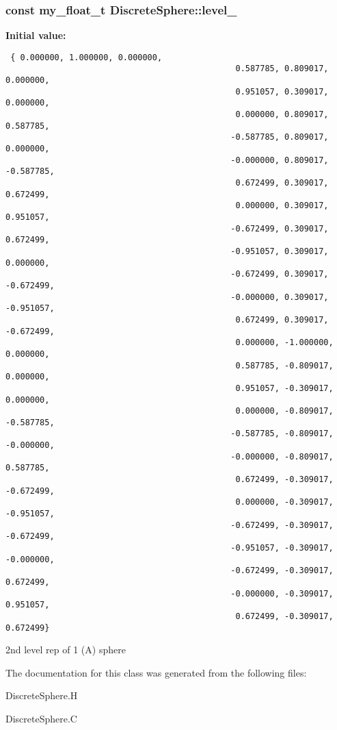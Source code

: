 \subsubsection{\setlength{\rightskip}{0pt plus 5cm}const my\_\-float\_\-t \bf{Discrete\-Sphere::level\_}\hspace{0.3cm}{\tt  [static, private]}}\label{classSimSite3D_1_1DiscreteSphere_e3e514caf92b337aae7cb629d90f9a61}


\textbf{Initial value:}

\begin{Code}\begin{verbatim} { 0.000000, 1.000000, 0.000000,
                                               0.587785, 0.809017, 0.000000,
                                               0.951057, 0.309017, 0.000000,
                                               0.000000, 0.809017, 0.587785,
                                              -0.587785, 0.809017, 0.000000,
                                              -0.000000, 0.809017, -0.587785,
                                               0.672499, 0.309017, 0.672499,
                                               0.000000, 0.309017, 0.951057,
                                              -0.672499, 0.309017, 0.672499,
                                              -0.951057, 0.309017, 0.000000,
                                              -0.672499, 0.309017, -0.672499,
                                              -0.000000, 0.309017, -0.951057,
                                               0.672499, 0.309017, -0.672499,
                                               0.000000, -1.000000, 0.000000,
                                               0.587785, -0.809017, 0.000000,
                                               0.951057, -0.309017, 0.000000,
                                               0.000000, -0.809017, -0.587785,
                                              -0.587785, -0.809017, -0.000000,
                                              -0.000000, -0.809017, 0.587785,
                                               0.672499, -0.309017, -0.672499,
                                               0.000000, -0.309017, -0.951057,
                                              -0.672499, -0.309017, -0.672499,
                                              -0.951057, -0.309017, -0.000000,
                                              -0.672499, -0.309017, 0.672499,
                                              -0.000000, -0.309017, 0.951057,
                                               0.672499, -0.309017, 0.672499}
\end{verbatim}\end{Code}
2nd level rep of 1 (A) sphere 



The documentation for this class was generated from the following files:\begin{CompactItemize}
\item 
Discrete\-Sphere.H\item 
Discrete\-Sphere.C\end{CompactItemize}
